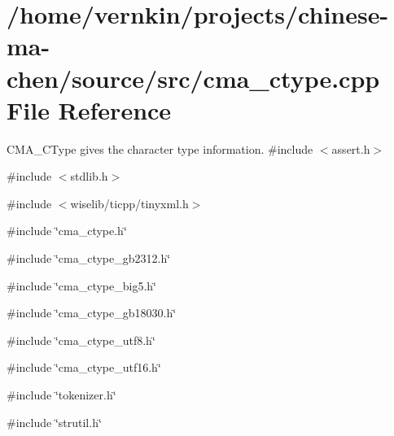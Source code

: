 \section{/home/vernkin/projects/chinese-\/ma-\/chen/source/src/cma\_\-ctype.cpp File Reference}
\label{cma__ctype_8cpp}


CMA\_\-CType gives the character type information.  
{\ttfamily \#include $<$assert.h$>$}\par
{\ttfamily \#include $<$stdlib.h$>$}\par
{\ttfamily \#include $<$wiselib/ticpp/tinyxml.h$>$}\par
{\ttfamily \#include \char`\"{}cma\_\-ctype.h\char`\"{}}\par
{\ttfamily \#include \char`\"{}cma\_\-ctype\_\-gb2312.h\char`\"{}}\par
{\ttfamily \#include \char`\"{}cma\_\-ctype\_\-big5.h\char`\"{}}\par
{\ttfamily \#include \char`\"{}cma\_\-ctype\_\-gb18030.h\char`\"{}}\par
{\ttfamily \#include \char`\"{}cma\_\-ctype\_\-utf8.h\char`\"{}}\par
{\ttfamily \#include \char`\"{}cma\_\-ctype\_\-utf16.h\char`\"{}}\par
{\ttfamily \#include \char`\"{}tokenizer.h\char`\"{}}\par
{\ttfamily \#include \char`\"{}strutil.h\char`\"{}}\par
